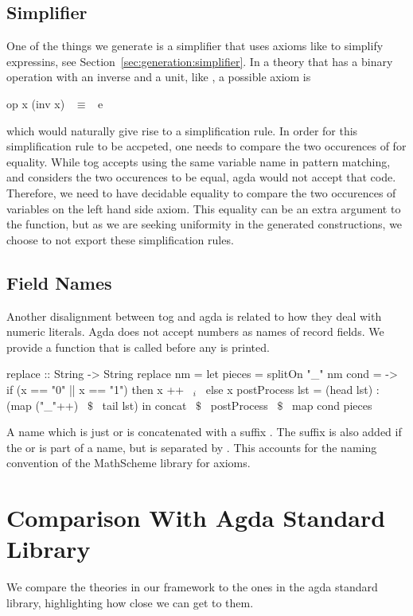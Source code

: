 \subsection{Simplifier}
One of the things we generate is a simplifier that uses axioms like  to simplify expressins, see Section~\ref{sec:generation:simplifier}. 
In a theory that has a binary operation with an inverse and a unit, like , a possible axiom is  
\begin{agdacode}
op x (inv x) ~$\equiv$~ e 
\end{agdacode}
which would naturally give rise to a simplification rule. In order for this simplification rule to be accpeted, one needs to compare the two occurences of  for equality. While tog accepts using the same variable name in pattern matching, and considers the two occurences to be equal, agda would not accept that code. Therefore, we need to have decidable equality to compare the two occurences of variables on the left hand side axiom. This equality can be an extra argument to the function, but as we are seeking uniformity in the generated constructions, we choose to not export these simplification rules. 

\subsection{Field Names}
Another disalignment between tog and agda is related to how they deal with numeric literals. Agda does not accept numbers as names of record fields. 
We provide a function  that is called before any  is printed. 
\begin{hscode}
replace :: String -> String
replace nm =
  let pieces = splitOn "_" nm
      cond = \x -> if (x == "0" || x == "1") then x ++ ~$_i$~ else x
      postProcess lst = (head lst) : (map ("_"++) ~$\$$~ tail lst)
  in concat ~$\$$~ postProcess ~$\$$~ map cond pieces 
\end{hscode}
A name which is just  or  is concatenated with a suffix . The suffix is also added if the  or  is part of a name, but is separated by \lstmath{_}. This accounts for the naming convention of the MathScheme library for axioms. 

\section{Comparison With Agda Standard Library}
\label{sec:compasion_agda_stdlib}
We compare the theories in our framework to the ones in the agda standard library, highlighting how close we can get to them. 

